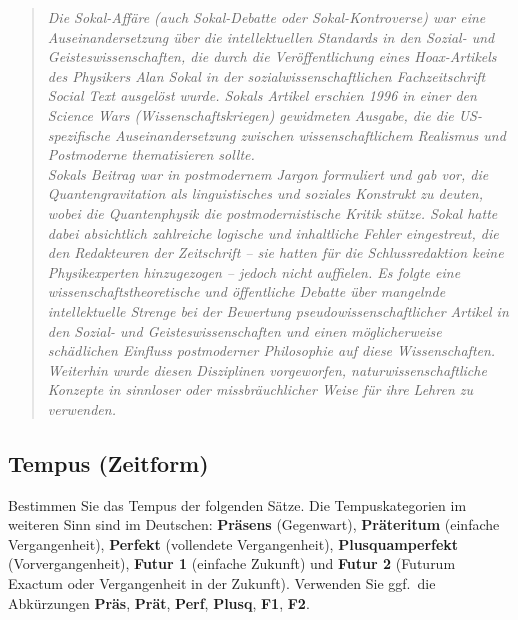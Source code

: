 \documentclass[12pt,a4paper,twoside]{article}
\begin{document}
\begin{quote}
  \onehalfspacing
  \it Die Sokal-Affäre (auch Sokal-Debatte oder Sokal-Kontroverse) war eine Auseinandersetzung über die intellektuellen Standards in den Sozial- und Geisteswissenschaften, die durch die Veröffentlichung eines Hoax-Artikels des Physikers Alan Sokal in der sozialwissenschaftlichen Fachzeitschrift Social Text ausgelöst wurde. Sokals Artikel erschien 1996 in einer den Science Wars (Wissenschaftskriegen) gewidmeten Ausgabe, die die US-spezifische Auseinandersetzung zwischen wissenschaftlichem Realismus und Postmoderne thematisieren sollte.\\
Sokals Beitrag war in postmodernem Jargon formuliert und gab vor, die Quantengravitation als linguistisches und soziales Konstrukt zu deuten, wobei die Quantenphysik die postmodernistische Kritik stütze. Sokal hatte dabei absichtlich zahlreiche logische und inhaltliche Fehler eingestreut, die den Redakteuren der Zeitschrift – sie hatten für die Schlussredaktion keine Physikexperten hinzugezogen – jedoch nicht auffielen. Es folgte eine wissenschaftstheoretische und öffentliche Debatte über mangelnde intellektuelle Strenge bei der Bewertung pseudowissenschaftlicher Artikel in den Sozial- und Geisteswissenschaften und einen möglicherweise schädlichen Einfluss postmoderner Philosophie auf diese Wissenschaften. Weiterhin wurde diesen Disziplinen vorgeworfen, naturwissenschaftliche Konzepte in sinnloser oder missbräuchlicher Weise für ihre Lehren zu verwenden.
\end{quote}

\subsection{ Tempus (Zeitform)}

Bestimmen Sie das Tempus der folgenden Sätze.
Die Tempuskategorien im weiteren Sinn sind im Deutschen: \textbf{Präsens} (Gegenwart), \textbf{Präteritum} (einfache Vergangenheit), \textbf{Perfekt} (vollendete Vergangenheit), \textbf{Plusquamperfekt} (Vorvergangenheit), \textbf{Futur 1} (einfache Zukunft) und \textbf{Futur 2} (Futurum Exactum oder Vergangenheit in der Zukunft).
Verwenden Sie ggf.\ die Abkürzungen \textbf{Präs}, \textbf{Prät}, \textbf{Perf}, \textbf{Plusq}, \textbf{F1}, \textbf{F2}.
\end{document}
